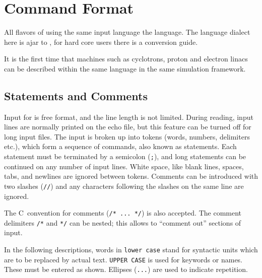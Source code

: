 

\chapter{Command Format}
\label{chp:format}
All flavors of \opal using the same input language the \mad language. The language dialect here is
ajar to \madnine, for hard core \madeight users there is a conversion guide.

 It is the first time that
machines such as cyclotrons, proton and electron linacs can be described within the same language
in the same simulation framework.
\section{Statements and Comments}
\label{sec:statements}
Input for \opal is free format, and the line length is not limited.
During reading, input lines are normally printed on the echo file,
but this feature can be turned off for long input files.
The input is broken up into tokens (words, numbers, delimiters etc.),
which form a sequence of commands, also known as statements.
Each statement must be terminated by a semicolon (\texttt{;}),
and long statements can be continued on any number of input lines.
White space, like blank lines, spaces, tabs,
and newlines are ignored between tokens.
Comments can be introduced with two slashes (\texttt{//})
and any characters following the slashes on the same line are ignored.

The C~convention for comments (\texttt{/* ... */}) is also accepted.
The comment delimiters \texttt{/*} and \texttt{*/} can be nested;
this allows to ``comment out'' sections of input.

In the following descriptions,
words in \texttt{lower case} stand for syntactic units
which are to be replaced by actual text.
\texttt{UPPER CASE} is used for keywords or names.
These must be entered as shown.
Ellipses (\texttt{...}) are used to indicate repetition.

